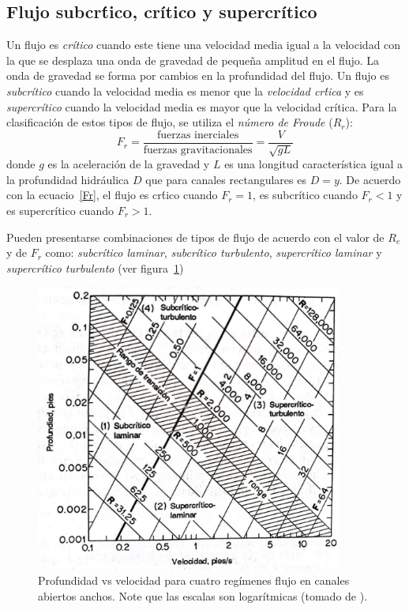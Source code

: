\documentclass[11pt, oneside]{article}
\begin{document}
\subsection{Flujo subcr\'tico, cr\'itico y supercr\'itico}
Un flujo es \emph{cr\'itico} cuando este tiene una velocidad media igual a la velocidad con la que se desplaza una onda de gravedad de pequeña amplitud en el flujo. La onda de gravedad se forma por cambios en la profundidad del flujo. Un flujo es \emph{subcr\'itico} cuando la velocidad media es menor que la \emph{velocidad cr\'tica} y es \emph{supercr\'itico} cuando la velocidad media es mayor que la velocidad cr\'itica. Para la clasificaci\'on de estos tipos de flujo, se utiliza el \emph{n\'umero de Froude} ($R_r$):
\begin{equation}
F_r = \frac{\text{fuerzas inerciales}}{\text{fuerzas gravitacionales}} = \frac{V}{\sqrt{g L}}
\label{Fr}
\end{equation}
donde $g$ es la aceleraci\'on de la gravedad y $L$ es una longitud característica igual a la profundidad hidráulica $D$ que para canales rectangulares es $D=y$. De acuerdo con la ecuacio~\ref{Fr}, el flujo es cr\'tico cuando $F_r = 1$, es subcr\'itico cuando $F_r < 1$ y es supercr\'itico cuando $F_r > 1$.

Pueden presentarse combinaciones de tipos de flujo de acuerdo con el valor de $R_e$ y de $F_r$ como: \emph{subcr\'itico laminar}, \emph{subcr\'itico turbulento}, \emph{supercr\'itico laminar} y \emph{supercr\'itico turbulento} (ver figura~\ref{fig41})

\begin{figure}[h]
\centering
\includegraphics[width=0.9\textwidth]{fig41.jpeg}
\caption{Profundidad vs velocidad para cuatro regímenes flujo en canales abiertos anchos. Note que las escalas son logarítmicas (tomado de \cite{VChow}).}
\label{fig41}
\end{figure}
\end{document}
